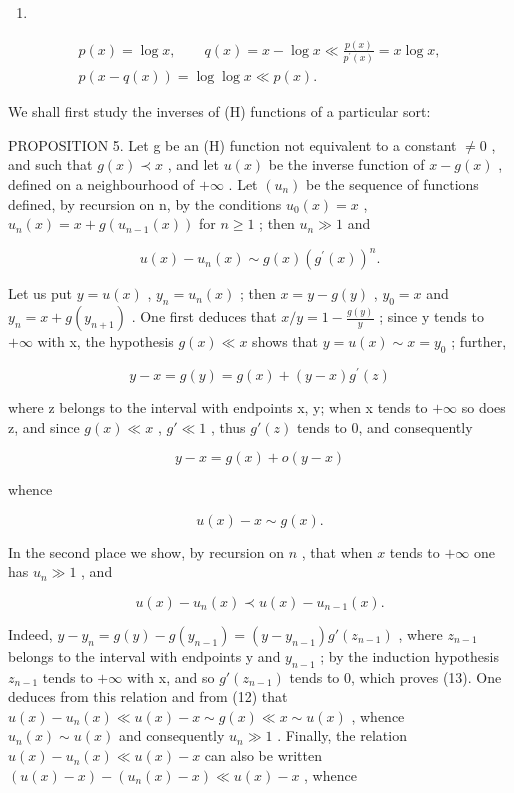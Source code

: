 \begin{enumerate}
\def\labelenumi{\alph{enumi})}
\setcounter{enumi}{1}
\tightlist
\item
\end{enumerate}

\[
\begin{array}{c} p (x) = \log x, \qquad q (x) = x - \log x \ll \frac {p (x)}{p ^ {\prime} (x)} = x \log x, \\ p (x - q (x)) = \log \log x \ll p (x). \end{array}
\]

We shall first study the inverses of (H) functions of a particular sort:

PROPOSITION 5. Let g be an (H) function not equivalent to a constant \(\neq 0\) , and such that \(g(x) \prec x\) , and let \(u(x)\) be the inverse function of \(x - g(x)\) , defined on a neighbourhood of \(+\infty\) . Let \((u_n)\) be the sequence of functions defined, by recursion on n, by the conditions \(u_0(x) = x\) , \(u_n(x) = x + g(u_{n-1}(x))\) for \(n \geqslant 1\) ; then \(u_n \gg 1\) and

\[
u (x) - u _ {n} (x) \sim g (x) \left(g ^ {\prime} (x)\right) ^ {n}.\tag{11}
\]

Let us put \(y = u(x)\) , \(y_{n} = u_{n}(x)\) ; then \(x = y - g(y)\) , \(y_{0} = x\) and \(y_{n} = x + g(y_{n+1})\) . One first deduces that \(x/y = 1 - \frac{g(y)}{y}\) ; since y tends to \(+\infty\) with x, the hypothesis \(g(x) \ll x\) shows that \(y = u(x) \sim x = y_{0}\) ; further,

\[
y - x = g (y) = g (x) + (y - x) g ^ {\prime} (z)
\]

where z belongs to the interval with endpoints x, y; when x tends to \(+\infty\) so does z, and since \(g(x) \ll x\) , \(g' \ll 1\) , thus \(g'(z)\) tends to 0, and consequently

\[
y - x = g (x) + o (y - x)
\]

whence

\[
u (x) - x \sim g (x).\tag{12}
\]

In the second place we show, by recursion on \(n\) , that when \(x\) tends to \(+\infty\) one has \(u_{n} \gg 1\) , and

\[
u (x) - u _ {n} (x) \prec u (x) - u _ {n - 1} (x).\tag{13}
\]

Indeed, \(y - y_{n} = g(y) - g(y_{n-1}) = (y - y_{n-1})g'(z_{n-1})\) , where \(z_{n-1}\) belongs to the interval with endpoints y and \(y_{n-1}\) ; by the induction hypothesis \(z_{n-1}\) tends to \(+\infty\) with x, and so \(g'(z_{n-1})\) tends to 0, which proves (13). One deduces from this relation and from (12) that \(u(x) - u_{n}(x) \ll u(x) - x \sim g(x) \ll x \sim u(x)\) , whence \(u_{n}(x) \sim u(x)\) and consequently \(u_{n} \gg 1\) . Finally, the relation \(u(x) - u_{n}(x) \ll u(x) - x\) can also be written \((u(x) - x) - (u_{n}(x) - x) \ll u(x) - x\) , whence

